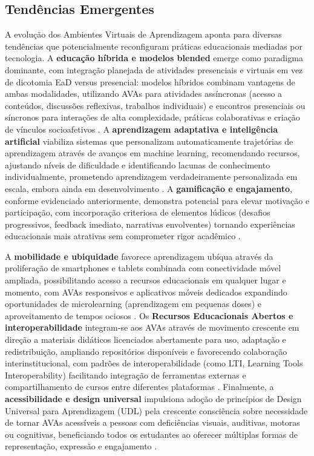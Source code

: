 \documentclass[portuguese]{sbc2025}%
\begin{document}
\subsection{Tendências Emergentes}

A evolução dos Ambientes Virtuais de Aprendizagem aponta para diversas tendências que potencialmente reconfiguram práticas educacionais mediadas por tecnologia. A \textbf{educação híbrida e modelos blended} emerge como paradigma dominante, com integração planejada de atividades presenciais e virtuais em vez de dicotomia EaD versus presencial: modelos híbridos combinam vantagens de ambas modalidades, utilizando AVAs para atividades assíncronas (acesso a conteúdos, discussões reflexivas, trabalhos individuais) e encontros presenciais ou síncronos para interações de alta complexidade, práticas colaborativas e criação de vínculos socioafetivos \cite{Graham2006, Dziuban2018}. A \textbf{aprendizagem adaptativa e inteligência artificial} viabiliza sistemas que personalizam automaticamente trajetórias de aprendizagem através de avanços em machine learning, recomendando recursos, ajustando níveis de dificuldade e identificando lacunas de conhecimento individualmente, prometendo aprendizagem verdadeiramente personalizada em escala, embora ainda em desenvolvimento \cite{Oxman2008}. A \textbf{gamificação e engajamento}, conforme evidenciado anteriormente, demonstra potencial para elevar motivação e participação, com incorporação criteriosa de elementos lúdicos (desafios progressivos, feedback imediato, narrativas envolventes) tornando experiências educacionais mais atrativas sem comprometer rigor acadêmico \cite{Deterding2011, Kapp2012, Santos2023_gamification}.

A \textbf{mobilidade e ubiquidade} favorece aprendizagem ubíqua através da proliferação de smartphones e tablets combinada com conectividade móvel ampliada, possibilitando acesso a recursos educacionais em qualquer lugar e momento, com AVAs responsivos e aplicativos móveis dedicados expandindo oportunidades de microlearning (aprendizagem em pequenas doses) e aproveitamento de tempos ociosos \cite{Crompton2013, Traxler2011}. Os \textbf{Recursos Educacionais Abertos e interoperabilidade} integram-se aos AVAs através de movimento crescente em direção a materiais didáticos licenciados abertamente para uso, adaptação e redistribuição, ampliando repositórios disponíveis e favorecendo colaboração interinstitucional, com padrões de interoperabilidade (como LTI, Learning Tools Interoperability) facilitando integração de ferramentas externas e compartilhamento de cursos entre diferentes plataformas \cite{Bates2015}. Finalmente, a \textbf{acessibilidade e design universal} impulsiona adoção de princípios de Design Universal para Aprendizagem (UDL) pela crescente consciência sobre necessidade de tornar AVAs acessíveis a pessoas com deficiências visuais, auditivas, motoras ou cognitivas, beneficiando todos os estudantes ao oferecer múltiplas formas de representação, expressão e engajamento \cite{Rose2002, Burgstahler2015}.
\end{document}
